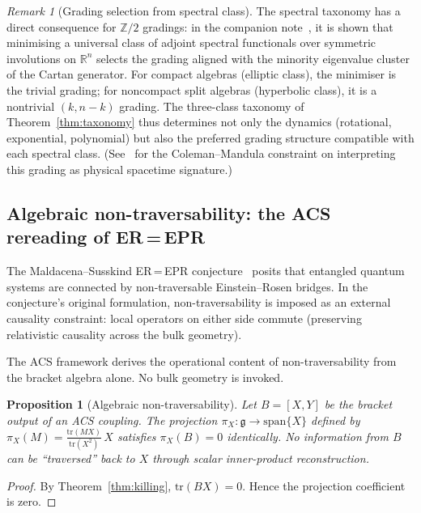 \documentclass[11pt,a4paper]{article}
\theoremstyle{plain}
\newtheorem{proposition}[theorem]{Proposition}
\theoremstyle{definition}
\theoremstyle{remark}
\newtheorem{remark}[theorem]{Remark}
\begin{document}
\begin{remark}[Grading selection from spectral class]
The spectral taxonomy has a direct consequence for $\mathbb{Z}/2$
gradings: in the companion note~\cite{WallaceN2}, it is shown that
minimising a universal class of adjoint spectral functionals over
symmetric involutions on $\mathbb{R}^n$ selects the grading
aligned with the minority eigenvalue cluster of the Cartan
generator.  For compact algebras (elliptic class), the minimiser is
the trivial grading; for noncompact split algebras (hyperbolic
class), it is a nontrivial $(k, n{-}k)$ grading.  The three-class
taxonomy of Theorem~\ref{thm:taxonomy} thus determines not only
the dynamics (rotational, exponential, polynomial) but also the
preferred grading structure compatible with each spectral class.
(See~\cite{WallaceN2} for the Coleman--Mandula constraint on
interpreting this grading as physical spacetime signature.)
\end{remark}

\subsection{Algebraic non-traversability: the ACS rereading of ER\,=\,EPR}
\label{sec:erepr}

The Maldacena--Susskind ER\,=\,EPR conjecture~\cite{MaldacenaSusskind2013}
posits that entangled quantum systems are connected by non-traversable
Einstein--Rosen bridges.  In the conjecture's original formulation,
non-traversability is imposed as an external causality constraint:
local operators on either side commute (preserving relativistic causality
across the bulk geometry).

The ACS framework derives the operational content of non-traversability
from the bracket algebra alone.  No bulk geometry is invoked.

\begin{proposition}[Algebraic non-traversability]\label{prop:non-trav}
Let $B = [X, Y]$ be the bracket output of an ACS coupling.  The
projection $\pi_X : \mathfrak{g} \to \mathrm{span}\{X\}$ defined by
\(
  \pi_X(M) = \frac{\mathrm{tr}(MX)}{\mathrm{tr}(X^2)}\,X
\)
satisfies $\pi_X(B) = 0$ identically.  No information from $B$ can
be ``traversed'' back to $X$ through scalar inner-product reconstruction.
\end{proposition}

\begin{proof}
By Theorem~\ref{thm:killing}, $\mathrm{tr}(BX) = 0$.  Hence the
projection coefficient is zero.
\end{proof}
\end{document}
